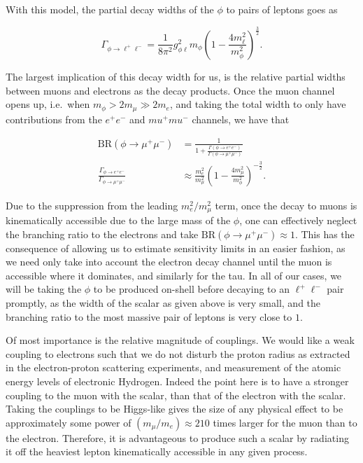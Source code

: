 With this model, the partial decay widths of the $\phi$ to pairs of leptons goes as

\begin{equation}
    \Gamma_{\phi \rightarrow \ell^+ \ell^-} = \frac{1}{8\pi^2} g_{\phi\ell}^2 m_\phi \left(1-\frac{4m_\ell^2}{m_\phi^2}\right)^{\frac{3}{2}}\textrm{.}
\end{equation}

\noindent The largest implication of this decay width for us, is the relative partial widths between muons and electrons as the decay products.
Once the muon channel opens up, i.e.\ when $m_\phi > 2 m_\mu \gg 2 m_e$, and taking the total width to only have contributions from the $e^+ e^-$ and $mu^+ mu^-$ channels, we have that

\begin{align}
    \textrm{BR}(\phi \rightarrow \mu^+ \mu^-) &= \frac{1}{1+\frac{\Gamma\left(\phi \rightarrow e^+ e^-\right)}{\Gamma\left(\phi \rightarrow \mu^+ \mu^-\right)}} \\
    \frac{\Gamma_{\phi \rightarrow e^+ e^-}}{\Gamma_{\phi \rightarrow \mu^+ \mu^-}} &\approx \frac{m_e^2}{m_\mu^2}\left(1-\frac{4m_\mu^2}{m_\phi^2}\right)^{-\frac{3}{2}}\textrm{.}
\end{align}

\noindent Due to the suppression from the leading $m_e^2/m_\mu^2$ term, once the decay to muons is kinematically accessible due to the large mass of the $\phi$, one can effectively neglect the branching ratio to the electrons and take $\textrm{BR}(\phi \rightarrow \mu^+ \mu^-) \approx 1$.
This has the consequence of allowing us to estimate sensitivity limits in an easier fashion, as we need only take into account the electron decay channel until the muon is accessible where it dominates, and similarly for the tau.
In all of our cases, we will be taking the $\phi$ to be produced on-shell before decaying to an $\ell^+ \ell^-$ pair promptly, as the width of the scalar as given above is very small, and the branching ratio to the most massive pair of leptons is very close to $1$.

Of most importance is the relative magnitude of couplings.
We would like a weak coupling to electrons such that we do not disturb the proton radius as extracted in the electron-proton scattering experiments, and measurement of the atomic energy levels of electronic Hydrogen.
Indeed the point here is to have a stronger coupling to the muon with the scalar, than that of the electron with the scalar.
Taking the couplings to be Higgs-like gives the size of any physical effect to be approximately some power of $(m_\mu/m_e) \approx 210$ times larger for the muon than to the electron.
Therefore, it is advantageous to produce such a scalar by radiating it off the heaviest lepton kinematically accessible in any given process.

